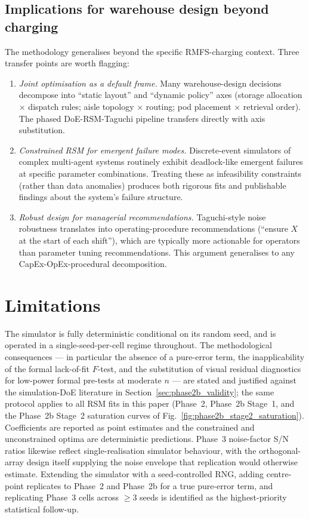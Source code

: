 \documentclass[conference]{IEEEtran}
\begin{document}
\subsection{Implications for warehouse design beyond charging}

The methodology generalises beyond the specific RMFS-charging context. Three transfer points are worth flagging:

\begin{enumerate}
  \item \emph{Joint optimisation as a default frame.} Many warehouse-design decisions decompose into ``static layout'' and ``dynamic policy'' axes (storage allocation × dispatch rules; aisle topology × routing; pod placement × retrieval order). The phased DoE-RSM-Taguchi pipeline transfers directly with axis substitution.
  \item \emph{Constrained RSM for emergent failure modes.} Discrete-event simulators of complex multi-agent systems routinely exhibit deadlock-like emergent failures at specific parameter combinations. Treating these as infeasibility constraints (rather than data anomalies) produces both rigorous fits and publishable findings about the system's failure structure.
  \item \emph{Robust design for managerial recommendations.} Taguchi-style noise robustness translates into operating-procedure recommendations (``ensure $X$ at the start of each shift''), which are typically more actionable for operators than parameter tuning recommendations. This argument generalises to any CapEx-OpEx-procedural decomposition.
\end{enumerate}

\section{Limitations}
\label{sec:limitations}
The simulator is fully deterministic conditional on its random seed, and is operated in a single-seed-per-cell regime throughout. The methodological consequences --- in particular the absence of a pure-error term, the inapplicability of the formal lack-of-fit $F$-test, and the substitution of visual residual diagnostics for low-power formal pre-tests at moderate $n$ --- are stated and justified against the simulation-DoE literature in Section~\ref{sec:phase2b_validity}; the same protocol applies to all RSM fits in this paper (Phase~2, Phase~2b Stage~1, and the Phase~2b Stage~2 saturation curves of Fig.~\ref{fig:phase2b_stage2_saturation}). Coefficients are reported as point estimates and the constrained and unconstrained optima are deterministic predictions. Phase~3 noise-factor S/N ratios likewise reflect single-realisation simulator behaviour, with the orthogonal-array design itself supplying the noise envelope that replication would otherwise estimate. Extending the simulator with a seed-controlled RNG, adding centre-point replicates to Phase~2 and Phase~2b for a true pure-error term, and replicating Phase~3 cells across $\ge 3$ seeds is identified as the highest-priority statistical follow-up.
\end{document}
